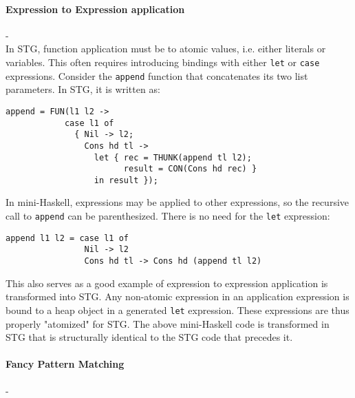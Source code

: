 \documentclass{llncs}
\begin{document}


\paragraph{Expression to Expression application} -\\

In STG, function application must be to atomic values, i.e. either literals or
variables.  This often requires introducing bindings with either \texttt{let} or
\texttt{case} expressions.  Consider the \texttt{append} function that
concatenates its two list parameters.  In STG, it is written as:

\begin{verbatim}
append = FUN(l1 l2 ->
            case l1 of
              { Nil -> l2;
                Cons hd tl -> 
                  let { rec = THUNK(append tl l2);
                        result = CON(Cons hd rec) }
                  in result });
\end{verbatim}

In mini-Haskell, expressions may be applied to other expressions, so the
recursive call to \texttt{append} can be parenthesized. There is no need for the
\texttt{let} expression:

\begin{verbatim}
append l1 l2 = case l1 of
                Nil -> l2
                Cons hd tl -> Cons hd (append tl l2)
\end{verbatim}

This also serves as a good example of expression to expression application is
transformed into STG.  Any non-atomic expression in an application expression is
bound to a heap object in a generated \texttt{let} expression.  These
expressions are thus properly "atomized" for STG.  The above mini-Haskell code
is transformed in STG that is structurally identical to the STG code that
precedes it.



\paragraph{Fancy Pattern Matching} -\\
\end{document}
